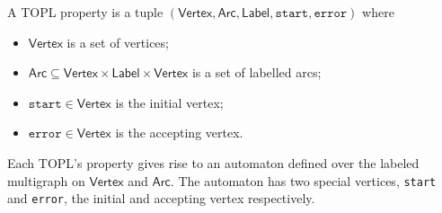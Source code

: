 \documentclass[10pt]{llncs} %
\newcommand{\B}{\ensuremath{\mathbb{B}}}
\newcommand{\N}{\ensuremath{\mathbb{N}}}
\newcommand{\pmap}{\rightharpoonup}
\newcommand{\set}[1]{\ensuremath{\mathsf{#1}}}
\newtheorem{notation}{Notation}
\begin{document}

\begin{definition}
A TOPL property is a tuple $(\set{Vertex}, \set{Arc}, \set{Label}, \texttt{start}, \texttt{error})$ where
\begin{itemize}
\item $\set{Vertex}$ is a set of vertices;
\item $\set{Arc} \subseteq \set{Vertex} \times \set{Label} \times \set{Vertex}$ is a set of labelled arcs;
\item $\texttt{start} \in \set{Vertex}$ is the initial vertex;
\item $\texttt{error} \in \set{Vertex}$ is the accepting vertex.
\end{itemize} 
\end{definition}
Each TOPL's property gives rise to an automaton defined over the labeled multigraph  on $\set{Vertex}$ and $\set{Arc}$.
The automaton has two special vertices, {\tt start} and {\tt error}, the initial and accepting vertex respectively.
\end{document}
